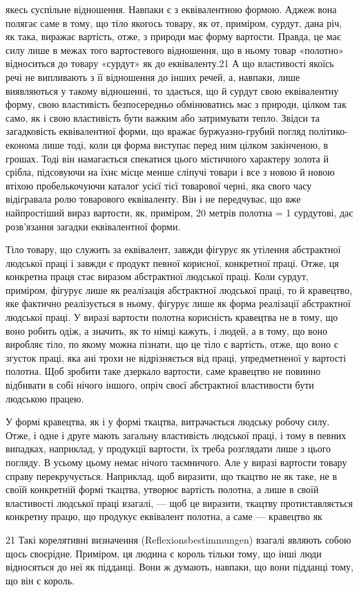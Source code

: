 якесь суспільне відношення. Навпаки є з еквівалентною формою. Аджеж вона полягає саме в тому, що
тіло якогось товару, як от, приміром, сурдут, дана річ, як така, виражає вартість, отже, з природи
має форму вартости. Правда, це має силу лише в межах того вартостевого відношення, що в ньому товар
«полотно» відноситься до товару «сурдут» як до еквіваленту.21 А що властивості
якоїсь речі не випливають з її відношення до інших речей, а, навпаки, лише виявляються у такому
відношенні, то здається, що й сурдут свою еквівалентну форму, свою властивість безпосередньо
обмінюватись має з природи, цілком так само, як і свою властивість бути важким або затримувати
тепло. Звідси та загадковість еквівалентної форми, що вражає буржуазно-грубий погляд
політико-економа лише тоді, коли ця форма виступає перед ним цілком закінченою, в грошах. Тоді він
намагається спекатися цього містичного характеру золота й срібла, підсовуючи на їхнє місце менше
сліпучі товари і все з новою й новою втіхою пробелькочуючи каталог усієї тієї товарової черні, яка
свого часу відігравала ролю товарового еквіваленту. Він і не передчуває, що вже найпростіший вираз
вартости, як, приміром, 20 метрів полотна = 1 сурдутові, дає розв’язання загадки еквівалентної
форми.

Тіло товару, що служить за еквівалент, завжди фігурує як утілення абстрактної людської праці і
завжди є продукт певної корисної, конкретної праці. Отже, ця конкретна праця стає виразом
абстрактної людської праці. Коли сурдут, приміром, фігурує лише як реалізація абстрактної людської
праці, то й кравецтво, яке фактично реалізується в ньому, фігурує лише як форма реалізації
абстрактної людської праці. У виразі вартости полотна корисність кравецтва не в тому, що воно робить
одіж, а значить, як то німці кажуть, і людей, а в тому, що воно виробляє тіло, по якому можна
пізнати, що це тіло є вартість, отже, що воно є згусток праці, яка ані трохи не відрізняється від
праці, упредметненої у вартості полотна. Щоб зробити таке дзеркало вартости, саме кравецтво не
повинно відбивати в собі нічого іншого, опріч своєї абстрактної властивости бути людською працею.

У формі кравецтва, як і у формі ткацтва, витрачається людську робочу силу. Отже, і одне і друге
мають загальну властивість людської праці, і тому в певних випадках, наприклад, у продукції
вартости, їх треба розглядати лише з цього погляду. В усьому цьому немає нічого таємничого. Але у
виразі вартости товару справу перекручується. Наприклад, щоб виразити, що ткацтво не як таке, не в
своїй конкретній формі ткацтва, утворює вартість полотна, а лише в своїй властивості людської праці
взагалі, — щоб це виразити, ткацтву протиставляється конкретну працю, що продукує еквівалент
полотна, а саме — кравецтво як

21 Такі корелятивні визначення (Reflexionsbestimmungen) взагалі являють собою щось своєрідне.
Приміром, ця людина є король тільки тому, що інші люди відносяться до неї як підданці. Вони ж
думають, навпаки, що вони підданці тому, що він є король.
